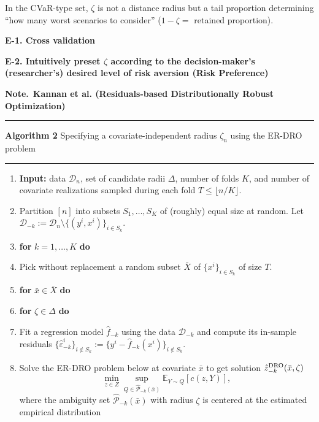 \documentclass[10pt,a4paper]{article}
\newcommand{\note}{\textbf{Note.}\ }
\begin{document}
In the CVaR-type set, $\zeta$ is not a distance radius but a tail proportion determining ``how many worst scenarios to consider'' ($1-\zeta=$ retained proportion).

\textbf{E-1. Cross validation}

\textbf{E-2. Intuitively preset $\zeta$ according to the decision-maker's (researcher's) desired level of risk aversion (Risk Preference)}

\begin{mdframed}[linewidth=0.6pt]
\footnotesize
\note \textbf{Kannan et al. (Residuals-based Distributionally Robust Optimization)}

\hrule\smallskip
\textbf{Algorithm 2} Specifying a covariate-independent radius $\zeta_n$ using the ER-DRO problem
\hrule\smallskip
\begin{enumerate}[label=\arabic*:,leftmargin=19pt,itemsep=2pt,parsep=0pt]
\item \textbf{Input:} data $\mathcal D_n$, set of candidate radii $\Delta$, number of folds $K$, and number of covariate realizations sampled during each fold $T\le\lfloor n/K\rfloor$.
\item Partition $[n]$ into subsets $S_1,\ldots,S_K$ of (roughly) equal size at random. Let $\mathcal D_{-k}:=\mathcal D_n\setminus\{(y^i,x^i)\}_{i\in S_k}$.
\item \textbf{for} $k=1,\ldots,K$ \textbf{do}
\item \hspace{6pt}Pick without replacement a random subset $\bar X$ of $\{x^i\}_{i\in S_k}$ of size $T$.
\item \hspace{6pt}\textbf{for} $\bar x\in\bar X$ \textbf{do}
\item \hspace{12pt}\textbf{for} $\zeta\in\Delta$ \textbf{do}
\item \hspace{18pt}Fit a regression model $\hat f_{-k}$ using the data $\mathcal D_{-k}$ and compute its in-sample residuals $\{\hat\varepsilon_{-k}^i\}_{i\notin S_k}:=\{y^i-\hat f_{-k}(x^i)\}_{i\notin S_k}$.
\item \hspace{18pt}Solve the ER-DRO problem below at covariate $\bar x$ to get solution $\hat z_{-k}^{\rm DRO}(\bar x,\zeta)$
\[
\min_{z\in Z}\sup_{Q\in\hat{\mathcal P}_{-k}(\bar x)}\mathbb E_{Y\sim Q}[c(z,Y)],
\]
where the ambiguity set $\hat{\mathcal P}_{-k}(\bar x)$ with radius $\zeta$ is centered at the estimated empirical distribution

\end{enumerate}
\end{mdframed}
\end{document}
